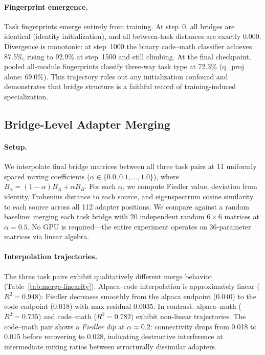 \paragraph{Fingerprint emergence.}
Task fingerprints emerge entirely from training. At step~0, all bridges
are identical (identity initialization), and all between-task distances
are exactly 0.000. Divergence is monotonic: at step~1000 the binary
code--math classifier achieves 87.5\%, rising to 92.9\% at step~1500
and still climbing. At the final checkpoint, pooled all-module
fingerprints classify three-way task type at 72.3\% (q\_proj alone:
69.0\%). This trajectory rules out any initialization
confound and demonstrates that bridge structure is a faithful record
of training-induced specialization.

\subsection{Bridge-Level Adapter Merging}
\label{sec:exp-merging}

\paragraph{Setup.}
We interpolate final bridge matrices between all three task pairs at 11
uniformly spaced mixing coefficients ($\alpha \in \{0.0, 0.1, \ldots,
1.0\}$), where $B_\alpha = (1 - \alpha) B_A + \alpha B_B$. For each
$\alpha$, we compute Fiedler value, deviation from identity, Frobenius
distance to each source, and eigenspectrum cosine similarity to each
source across all 112 adapter positions. We compare against a random
baseline: merging each task bridge with 20 independent random $6 \times
6$ matrices at $\alpha = 0.5$. No GPU is required---the entire experiment
operates on 36-parameter matrices via linear algebra.

\paragraph{Interpolation trajectories.}
The three task pairs exhibit qualitatively different merge behavior
(Table~\ref{tab:merge-linearity}). Alpaca--code interpolation is
approximately linear ($R^2 = 0.948$): Fiedler decreases smoothly from
the alpaca endpoint (0.040) to the code endpoint (0.018) with
max residual 0.0035. In contrast, alpaca--math ($R^2 = 0.735$) and
code--math ($R^2 = 0.782$) exhibit non-linear trajectories. The
code--math pair shows a \emph{Fiedler dip} at $\alpha \approx 0.2$:
connectivity drops from 0.018 to 0.015 before recovering to 0.028,
indicating destructive interference at intermediate mixing ratios between
structurally dissimilar adapters.

